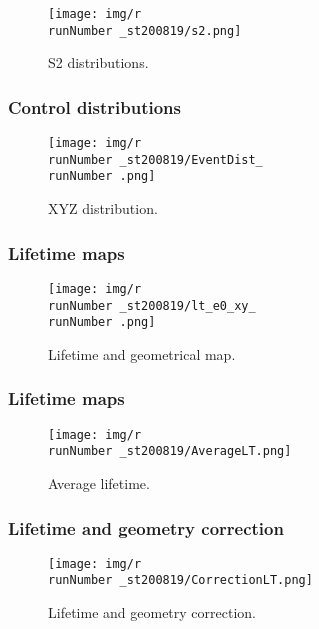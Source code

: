 \begin{frame}
\begin{figure}
  \begin{center}
      \texttt{[image: img/r\\runNumber \_st200819/s2.png]}
    \caption{S2 distributions.}
  \end{center}
\end{figure}
\end{frame}

\begin{frame}
\frametitle{Control distributions}
\begin{figure}
  \begin{center}
      \texttt{[image: img/r\\runNumber \_st200819/EventDist\_\\runNumber .png]}
    \caption{XYZ distribution.}
  \end{center}
\end{figure}
\end{frame}

\begin{frame}
\frametitle{Lifetime maps}
\begin{figure}
  \begin{center}
      \texttt{[image: img/r\\runNumber \_st200819/lt\_e0\_xy\_\\runNumber .png]}
    \caption{Lifetime and geometrical map.}
  \end{center}
\end{figure}
\end{frame}

\begin{frame}
\frametitle{Lifetime maps}
\begin{figure}
  \begin{center}
      \texttt{[image: img/r\\runNumber \_st200819/AverageLT.png]}
    \caption{Average lifetime.}
  \end{center}
\end{figure}
\end{frame}

\begin{frame}
\frametitle{Lifetime and geometry correction}
\begin{figure}
  \begin{center}
      \texttt{[image: img/r\\runNumber \_st200819/CorrectionLT.png]}
    \caption{Lifetime and geometry correction.}
  \end{center}
\end{figure}
\end{frame}

